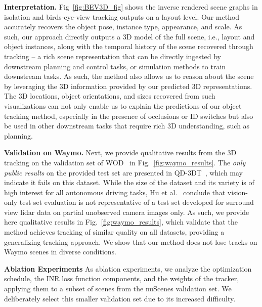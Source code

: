 \vspace{0.5\baselineskip}
\noindent
\textbf{Interpretation.} Fig~\ref{fig:BEV3D_fig} shows the inverse rendered scene graphs in isolation and birds-eye-view tracking outputs on a layout level. Our method accurately recovers the object pose, instance type, appearance, and scale. As such, our approach directly outputs a 3D model of the full scene, i.e., layout and object instances, along with the temporal history of the scene recovered through tracking -- a rich scene representation that can be directly ingested by downstream planning and control tasks, or simulation methods to train downstream tasks. As such, the method also allows us to reason about the scene by leveraging the 3D information provided by our predicted 3D representations. The 3D locations, object orientations, and sizes recovered from such visualizations can not only enable us to explain the predictions of our object tracking method, especially in the presence of occlusions or ID switches but also be used in other downstream tasks that require rich 3D understanding, such as planning. 


\vspace{0.5\baselineskip}
\noindent
\textbf{Validation on Waymo.}
Next, we provide qualitative results from the 3D tracking on the validation set of WOD~\cite{sun2020scalability} in Fig.~\ref{fig:waymo_results}. The \emph{only public results} on the provided test set are presented in QD-3DT~\cite{hu2021QD3DT}, which may indicate it fails on this dataset. While the size of the dataset and its variety is of high interest for all autonomous driving tasks, Hu et al.~\cite{hu2021QD3DT} conclude that vision-only test set evaluation is not representative of a test set developed for surround view lidar data on partial unobserved camera images only. As such, we provide here qualitative results in Fig.~\ref{fig:waymo_results}, which validate that the method achieves tracking of similar quality on all datasets, providing a generalizing tracking approach. We show that our method does not lose tracks on Waymo scenes in diverse conditions.

% 

% 
\vspace{0.5\baselineskip}
\noindent
\textbf{Ablation Experiments}
%
As ablation experiments, we analyze the optimization schedule, the INR loss function components, and the weights of the tracker, applying them to a subset of scenes from the nuScenes validation set. We deliberately select this smaller validation set due to its increased difficulty.


